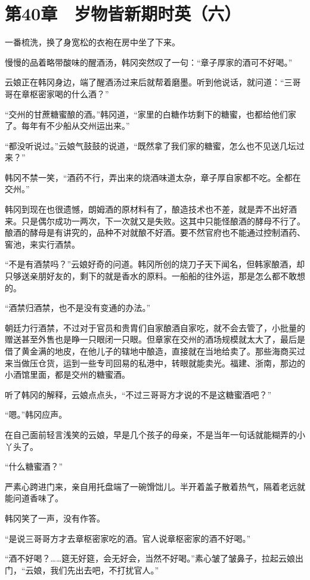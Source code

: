 \section{第40章　岁物皆新期时英（六）}

一番梳洗，换了身宽松的衣袍在房中坐了下来。

慢慢的品着略带酸味的醒酒汤，韩冈突然叹了一句：“章子厚家的酒可不好喝。”

云娘正在韩冈身边，端了醒酒汤过来后就帮着磨墨。听到他说话，就问道：“三哥哥在章枢密家喝的什么酒？”

“交州的甘蔗糖蜜酿的酒。”韩冈道，“家里的白糖作坊剩下的糖蜜，也都给他们家了。每年有不少船从交州运出来。”

“都没听说过。”云娘气鼓鼓的说道，“既然拿了我们家的糖蜜，怎么也不见送几坛过来？”

韩冈不禁一笑，“酒药不行，弄出来的烧酒味道太杂，章子厚自家都不吃。全都在交州。”

韩冈到现在也很遗憾，朗姆酒的原材料有了，酿造技术也不差，就是弄不出好酒来。只是偶尔成功一两次，下一次就又是失败。这其中只能怪酿酒的酵母不行了。酿酒的酵母是有讲究的，品种不对就酿不好酒。要不然官府也不能通过控制酒药、窖池，来实行酒禁。

“不是有酒禁吗？”云娘好奇的问道。韩冈所创的烧刀子天下闻名，但韩家酿酒，却只够送亲朋好友的，剩下的就是香水的原料。一船船的往外运，那是怎么都不敢想的。

“酒禁归酒禁，也不是没有变通的办法。”

朝廷力行酒禁，不过对于官员和贵胄们自家酿酒自家吃，就不会去管了，小批量的赠送甚至外售也是睁一只眼闭一只眼。但章家在交州的酒场规模就太大了，最后是借了黄金满的地皮，在他儿子的辖地中酿造，直接就在当地给卖了。那些海商买过来当做压仓货，运到一些专司回易的私港中，转眼就能卖光。福建、浙南，那边的小酒馆里面，都是交州的糖蜜酒。

听了韩冈的解释，云娘点点头，“不过三哥哥方才说的不是这糖蜜酒吧？”

“嗯。”韩冈应声。

在自己面前轻言浅笑的云娘，早是几个孩子的母亲，不是当年一句话就能糊弄的小丫头了。

“什么糖蜜酒？”

严素心跨进门来，亲自用托盘端了一碗馉饳儿。半开着盖子散着热气，隔着老远就能问道香味了。

韩冈笑了一声，没有作答。

“是说三哥哥方才去章枢密家吃的酒。官人说章枢密家的酒不好喝。”

“酒不好喝？……筵无好筵，会无好会，当然不好喝。”素心皱了皱鼻子，拉起云娘出门，“云娘，我们先出去吧，不打扰官人。”

